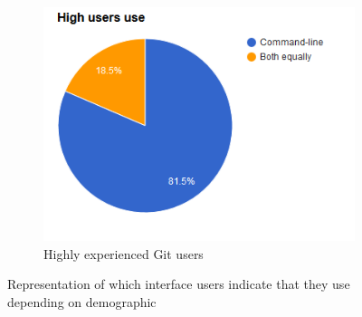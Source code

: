 \documentclass[a4paper,oneside]{bth} %
\begin{document}
\begin{figure}[H]
\begin{subfigure}[b]{0.315\textwidth}
						\label{fig:Mid users use}
					\end{subfigure}
					~
					\begin{subfigure}[b]{0.315\textwidth}
						\includegraphics[width=\textwidth]{graphs/high-users-use.png}
						\caption{Highly experienced Git users}
						\label{fig:High users use}
					\end{subfigure}
					\caption{Representation of which interface users indicate that they use depending on demographic}\label{fig:mid-high-users-use}
				\end{figure}
				
\end{document}
